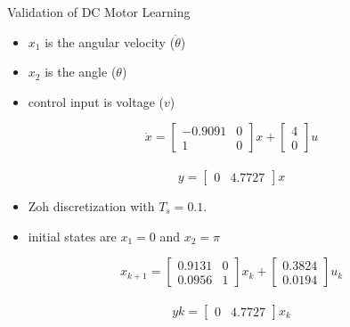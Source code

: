 \begin{frame}{Validation of DC Motor Learning}
     \begin{itemize}
    \item $x_1$ is the angular velocity ($\dot{\theta}$)
    \item $x_2$ is the angle ($\theta$) 
    \item control input is voltage ($v$)
    
    \end{itemize}
    \[  \dot{x} = \begin{bmatrix}
        -0.9091 & 0 \\ 
        1 & 0
    \end{bmatrix} x + \begin{bmatrix}
        4 \\ 0
    \end{bmatrix} u \] \\
   \[ y = \begin{bmatrix}
        0 & 4.7727
    \end{bmatrix} x \]

    \begin{itemize}
        \item Zoh discretization with $T_s=0.1$.
        \item initial states are $x_1 = 0$ and $x_2=\pi$
    \end{itemize}
           \[  x_{k+1} = \begin{bmatrix}
        0.9131 & 0 \\ 
        0.0956 & 1
    \end{bmatrix} x_k + \begin{bmatrix}
        0.3824 \\ 0.0194
    \end{bmatrix} u_k \] \\
     \[ yk = \begin{bmatrix}
        0 & 4.7727
    \end{bmatrix} x_k \]

%     
    
\end{frame}

